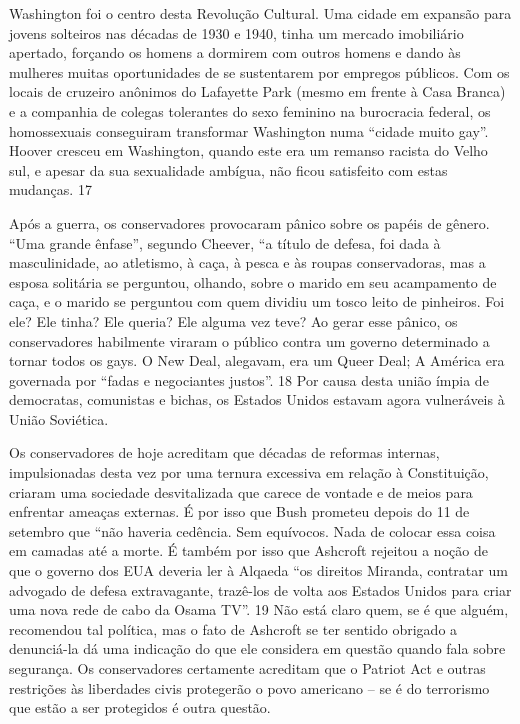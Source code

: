  
\par
 
Washington foi o centro desta Revolução Cultural. Uma cidade em expansão para jovens solteiros nas décadas de 1930 e 1940, tinha um mercado imobiliário apertado, forçando os homens a dormirem com outros homens e dando às mulheres muitas oportunidades de se sustentarem por empregos públicos. Com os locais de cruzeiro anônimos do Lafayette Park (mesmo em frente à Casa Branca) e a companhia de colegas tolerantes do sexo feminino na burocracia federal, os homossexuais conseguiram transformar Washington numa “cidade muito gay”. Hoover cresceu em Washington, quando este era um remanso racista do Velho sul, e apesar da sua sexualidade ambígua, não ficou satisfeito com estas mudanças.
 {\color{blue} 17}  

 
\par
 
Após a guerra, os conservadores provocaram pânico sobre os papéis de gênero. “Uma grande ênfase”, segundo Cheever, “a título de defesa, foi dada à masculinidade, ao atletismo, à caça, à pesca e às roupas conservadoras, mas a esposa solitária se perguntou, olhando, sobre o marido em seu acampamento de caça, e o marido se perguntou com quem dividiu um tosco leito de pinheiros. Foi ele? Ele tinha? Ele queria? Ele alguma vez teve? Ao gerar esse pânico, os conservadores habilmente viraram o público contra um governo determinado a tornar todos os gays. O New Deal, alegavam, era um Queer Deal; A América era governada por “fadas e negociantes justos”.
 {\color{blue} 18}  
Por causa desta união ímpia de democratas, comunistas e bichas, os Estados Unidos estavam agora vulneráveis ​​à União Soviética.
 
\par
 
Os conservadores de hoje acreditam que décadas de reformas internas, impulsionadas desta vez por uma ternura excessiva em relação à Constituição, criaram uma sociedade desvitalizada que carece de vontade e de meios para enfrentar ameaças externas. É por isso que Bush prometeu depois do 11 de setembro que “não haveria cedência. Sem equívocos. Nada de colocar essa coisa em camadas até a morte. É também por isso que Ashcroft rejeitou a noção de que o governo dos EUA deveria ler à Alqaeda “os direitos Miranda, contratar um advogado de defesa extravagante, trazê-los de volta aos Estados Unidos para criar uma nova rede de cabo da Osama TV”.
 {\color{blue} 19}  
Não está claro quem, se é que alguém, recomendou tal política, mas o fato de Ashcroft se ter sentido obrigado a denunciá-la dá uma indicação do que ele considera em questão quando fala sobre segurança. Os conservadores certamente acreditam que o Patriot Act e outras restrições às liberdades civis protegerão o povo americano – se é do terrorismo que estão a ser protegidos é outra questão.
 
